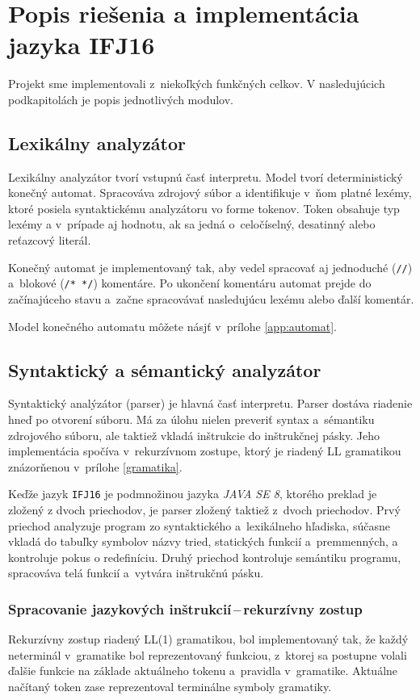 \documentclass[11pt,a4paper]{article}
\begin{document}
	\section{Popis riešenia a implementácia jazyka IFJ16}
	\label{popis}

	Projekt sme implementovali z~niekoľkých funkčných celkov. V nasledujúcich podkapitolách je popis jednotlivých modulov.

	\subsection{Lexikálny analyzátor}
	\label{lexer}
	Lexikálny analyzátor tvorí vstupnú časť interpretu. Model tvorí deterministický
	konečný automat. Spracováva zdrojový súbor a identifikuje v~ňom platné lexémy,
	ktoré posiela syntaktickému analyzátoru vo forme tokenov. Token obsahuje typ lexémy
	a v~prípade aj hodnotu, ak sa jedná o~celočíselný, desatinný alebo reťazcový literál.

    Konečný automat je implementovaný tak, aby vedel spracovať aj jednoduché (\texttt{//})
    a~blokové (\texttt{/* */}) komentáre. Po ukončení komentáru  automat prejde do
	začínajúceho stavu a~začne spracovávať nasledujúcu lexému alebo ďalší komentár.

	Model konečného automatu môžete násjť v~prílohe \ref{app:automat}.


	\subsection{Syntaktický a sémantický analyzátor}
	\label{parser}
	Syntaktický analýzátor (parser) je hlavná časť interpretu. Parser dostáva
	riadenie hneď po otvorení súboru. Má za úlohu nielen preveriť syntax
	a~sémantiku zdrojového súboru, ale taktiež vkladá inštrukcie do inštrukčnej
	pásky. Jeho implementácia spočíva v~rekurzívnom zostupe, ktorý je riadený
	LL gramatikou znázorňenou v~prílohe \ref{gramatika}.

	Keďže jazyk \texttt{IFJ16} je podmnožinou jazyka \emph{JAVA SE 8},
	ktorého preklad je zložený z dvoch priechodov, je parser zložený
	taktiež z~dvoch priechodov. Prvý priechod analyzuje program zo syntaktického
	a~lexikálneho hľadiska, súčasne vkladá do tabuľky symbolov názvy tried,
	statických funkcií a~premmenných, a kontroluje pokus o redefiníciu.
	Druhý priechod kontroluje semántiku
	programu, spracováva telá funkcií a~vytvára inštrukčnú pásku.



	\subsubsection{Spracovanie jazykových inštrukcií\,--\,rekurzívny zostup}
	\label{rekurzia}
	Rekurzívny zostup riadený LL(1) gramatikou, bol implementovaný tak, že každý
	neterminál v~gramatike bol reprezentovaný funkciou, z~ktorej sa postupne
	volali ďalšie funkcie na základe aktuálneho tokenu a~pravidla v~gramatike.
	Aktuálne načítaný token zase reprezentoval terminálne symboly gramatiky.
\end{document}

